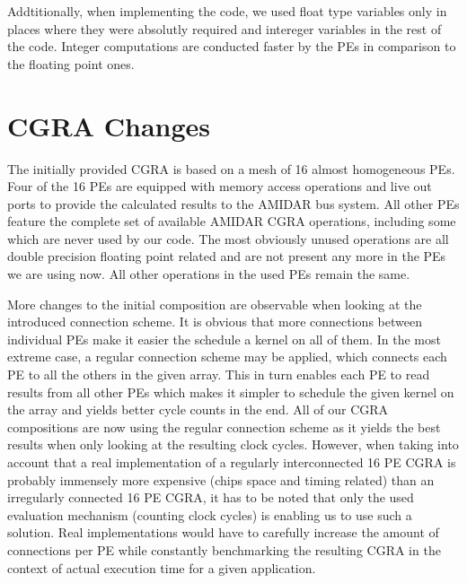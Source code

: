       Addtitionally, when implementing the code, we used float type variables only in places where they were absolutly required and intereger variables in the rest of the code. Integer computations are conducted faster by the PEs in comparison to the floating point ones. 
      
  

	\section{CGRA Changes} %
	\label{sec:cgra_changes}\newline
	
		The initially provided CGRA is based on a mesh of \num{16} almost homogeneous PEs. Four of the \num{16} PEs are equipped with memory access operations and live out ports to provide the calculated results to the AMIDAR bus system. All other PEs feature the complete set of available AMIDAR CGRA operations, including some which are never used by our code. The most obviously unused operations are all double precision floating point related and are not present any more in the PEs we are using now. All other operations in the used PEs remain the same.\newline
		
		More changes to the initial composition are observable when looking at the introduced connection scheme. It is obvious that more connections between individual PEs make it easier the schedule a kernel on all of them. In the most extreme case, a regular connection scheme may be applied, which connects each PE to all the others in the given array. This in turn enables each PE to read results from all other PEs which makes it simpler to schedule the given kernel on the array and yields better cycle counts in the end. All of our CGRA compositions are now using the regular connection scheme as it yields the best results when only looking at the resulting clock cycles. However, when taking into account that a real implementation of a regularly interconnected 16 PE CGRA is probably immensely more expensive (chips space and timing related) than an irregularly connected 16 PE CGRA, it has to be noted that only the used evaluation mechanism (counting clock cycles) is enabling us to use such a solution. Real implementations would have to carefully increase the amount of connections per PE while constantly benchmarking the resulting CGRA in the context of actual execution time for a given application.\newline
		
